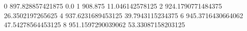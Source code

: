 0 897.828857421875 0.0
1 908.875 11.046142578125
2 924.1790771484375 26.3502197265625
4 937.6231689453125 39.7943115234375
6 945.3716430664062 47.54278564453125
8 951.1597290039062 53.33087158203125
